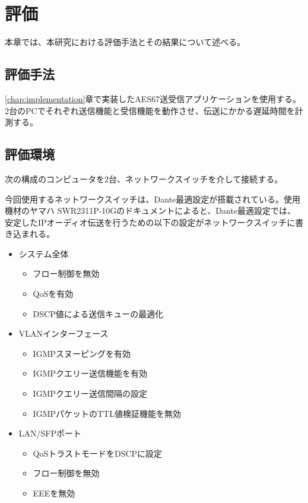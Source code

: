 \chapter{評価}
\label{chap:evaluation}

本章では、本研究における評価手法とその結果について述べる。

\section{評価手法}

\ref{chap:implementation}章で実装したAES67送受信アプリケーションを使用する。2台のPCでそれぞれ送信機能と受信機能を動作させ、伝送にかかる遅延時間を計測する。

\section{評価環境}

次の構成のコンピュータを2台、ネットワークスイッチを介して接続する。

今回使用するネットワークスイッチは、Dante最適設定が搭載されている。使用機材のヤマハ SWR2311P-10Gのドキュメント\cite{yamaha-swr2311p-dante}によると、Dante最適設定では、安定したIPオーディオ伝送を行うための以下の設定がネットワークスイッチに書き込まれる。

\begin{itemize}
  \item システム全体
  \begin{itemize}
    \item フロー制御を無効
    \item QoSを有効
    \item DSCP値による送信キューの最適化
  \end{itemize}
  \item VLANインターフェース
  \begin{itemize}
    \item IGMPスヌーピングを有効
    \item IGMPクエリー送信機能を有効
    \item IGMPクエリー送信間隔の設定
    \item IGMPパケットのTTL値検証機能を無効
  \end{itemize}
  \item LAN/SFPポート
  \begin{itemize}
    \item QoSトラストモードをDSCPに設定
    \item フロー制御を無効
    \item EEEを無効
  \end{itemize}
\end{itemize}

